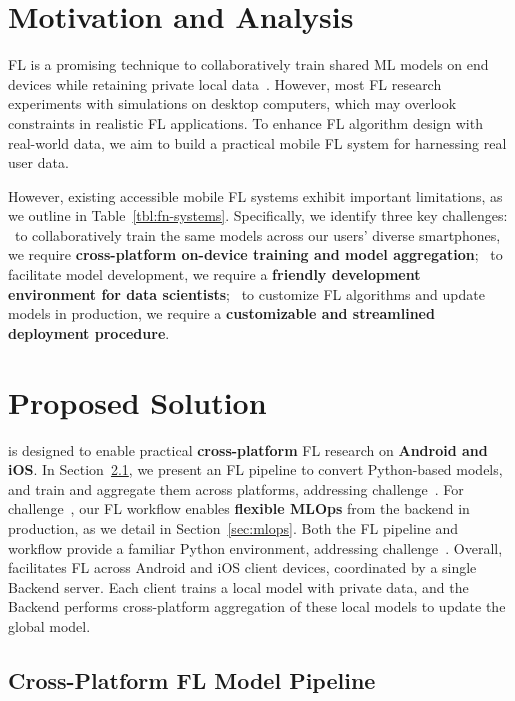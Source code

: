 \documentclass[conference]{IEEEtran}
\begin{document}
\section{Motivation and Analysis}

FL is a promising technique to collaboratively train shared ML models on
end devices while retaining private local data~\cite{wang2023federated}.
However, most FL research experiments with simulations on desktop computers,
which may overlook constraints in realistic FL applications.
To enhance FL algorithm design with real-world data,
we aim to build a practical mobile FL system for
harnessing real user data.

However,
existing accessible mobile FL systems exhibit important limitations,
as we outline in Table~\ref{tbl:fn-systems}.
Specifically, we identify three key challenges:
\challa~to collaboratively train the same models across
our users' diverse smartphones,
we require \textbf{cross-platform on-device training and model aggregation};
\challb~to facilitate model development,
we require a \textbf{friendly development environment for data scientists};
\challc~to customize FL algorithms and update models in production,
we require a \textbf{customizable and streamlined deployment procedure}.

\section{Proposed Solution}

\FedKit{} is designed to enable practical \textbf{cross-platform} FL research on
\textbf{Android and iOS}.
In Section~\ref{sec:pipeline},
we present an FL pipeline to convert Python-based models,
and train and aggregate them across platforms,
addressing challenge~\challa{}.
For challenge~\challc{},
our FL workflow enables \textbf{flexible MLOps} from the backend in production,
as we detail in Section~\ref{sec:mlops}.
Both the FL pipeline and workflow provide a familiar Python environment,
addressing challenge~\challb{}.
Overall,
\FedKit{} facilitates FL across Android and iOS client devices,
coordinated by a single Backend server.
Each client trains a local model with private data,
and the Backend performs cross-platform aggregation of these local models to update the global model.

\subsection{Cross-Platform FL Model Pipeline}
\label{sec:pipeline}
\end{document}

